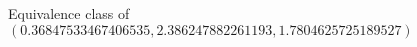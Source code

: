\documentclass[preview]{standalone}
\begin{document}
\begin{center}
Equivalence class of $(0.36847533467406535, 2.386247882261193, 1.7804625725189527)$
\end{center}
\end{document}
